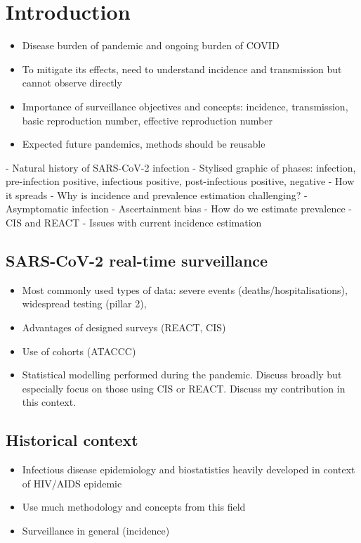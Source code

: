 \documentclass[thesis.tex]{subfiles}
\begin{document}
\chapter{Introduction} \label{intro}

\begin{itemize}
    \item Disease burden of pandemic and ongoing burden of COVID
    \item To mitigate its effects, need to understand incidence and transmission but cannot observe directly
    \item Importance of surveillance objectives and concepts: incidence, transmission, basic reproduction number, effective reproduction number
    \item Expected future pandemics, methods should be reusable
\end{itemize}

- Natural history of SARS-CoV-2 infection
	- Stylised graphic of phases: infection, pre-infection positive, infectious positive, post-infectious positive, negative
	- How it spreads
- Why is incidence and prevalence estimation challenging?
	- Asymptomatic infection
	- Ascertainment bias
- How do we estimate prevalence
	- CIS and REACT
- Issues with current incidence estimation

\section{SARS-CoV-2 real-time surveillance}

\begin{itemize}
    \item Most commonly used types of data: severe events (deaths/hospitalisations), widespread testing (pillar 2), 
    \item Advantages of designed surveys (REACT, CIS)
    \item Use of cohorts (ATACCC)
    \item Statistical modelling performed during the pandemic. Discuss broadly but especially focus on those using CIS or REACT. Discuss my contribution in this context.
\end{itemize}


\section{Historical context}

\begin{itemize}
    \item Infectious disease epidemiology and biostatistics heavily developed in context of HIV/AIDS epidemic
    \item Use much methodology and concepts from this field
    \item Surveillance in general (incidence)
\end{itemize}
\end{document}
